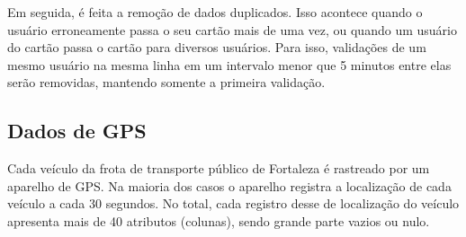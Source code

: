 \documentclass[        
    a4paper,          %
    12pt,             %
    chapter=TITLE,    %
    section=Title,    %
    subsection=Title, %
    oneside,          %
    english,          %
    spanish,          %
    brazil,           %
    fleqn             %
]{abntex2}
\begin{document}
  \begin{table}[!h]
  \captionsetup{width=16cm}%
    \end{table}
  
  Em seguida, é feita a remoção de dados duplicados. Isso acontece quando o usuário erroneamente passa o seu cartão mais de uma vez, ou quando um usuário do cartão passa o cartão para diversos usuários. Para isso, validações de um mesmo usuário na mesma linha em um intervalo menor que 5 minutos entre elas serão removidas, mantendo somente a primeira validação.
  
  \hypertarget{dados-de-gps}{%
  \subsection{Dados de GPS}\label{dados-de-gps}}
  
  Cada veículo da frota de transporte público de Fortaleza é rastreado por um aparelho de GPS. Na maioria dos casos o aparelho registra a localização de cada veículo a cada 30 segundos. No total, cada registro desse de localização do veículo apresenta mais de 40 atributos (colunas), sendo grande parte vazios ou nulo.
  
\end{document}
